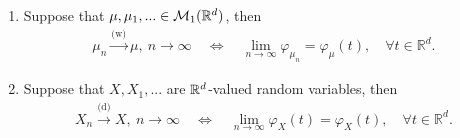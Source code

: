 		\begin{lsuperwichtigersatz}
			\begin{theorem}\label{levy_special}
				{}
				\begin{enumerate}[label=(\roman*)]
					\item Suppose that $\mu,\mu_1,...\in \mathcal{M}_1(\mathbb{R}^d)$, then
					\begin{align*}
						\mu_n \overset{\text{(w)}}{\longrightarrow} \mu,\: n \to \infty \quad\Leftrightarrow \quad \lim_{n\to\infty} \varphi_{\mu_n} = \varphi_\mu(t), \quad \forall t \in \mathbb{R}^d.
					\end{align*}
					\item Suppose that $X,X_1,...$ are $\mathbb{R}^d$-valued random variables, then
						\begin{align*}
						X_n \overset{\text{(d)}}{\longrightarrow} X, \: n \to \infty \quad \Leftrightarrow \quad \lim_{n\to\infty}\varphi_X(t) = \varphi_X(t), \quad \forall t \in \mathbb{R}^d.
					\end{align*}				
				\end{enumerate}
			\end{theorem}
		\end{lsuperwichtigersatz}
